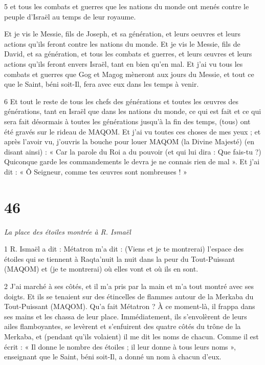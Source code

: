 \par 5 et tous les combats et guerres que les nations du monde ont menés contre le peuple d'Israël au temps de leur royaume.

\par Et je vis le Messie, fils de Joseph, et sa génération, et leurs oeuvres et leurs actions qu'ils feront contre les nations du monde. Et je vis le Messie, fils de David, et sa génération, et tous les combats et guerres, et leurs œuvres et leurs actions qu'ils feront envers Israël, tant en bien qu'en mal. Et j'ai vu tous les combats et guerres que Gog et Magog mèneront aux jours du Messie, et tout ce que le Saint, béni soit-Il, fera avec eux dans les temps à venir.

\par 6 Et tout le reste de tous les chefs des générations et toutes les œuvres des générations, tant en Israël que dans les nations du monde, ce qui est fait et ce qui sera fait désormais à toutes les générations jusqu'à la fin des temps, (tous) ont été gravés sur le rideau de MAQOM. Et j'ai vu toutes ces choses de mes yeux ; et après l'avoir vu, j'ouvris la bouche pour louer MAQOM (la Divine Majesté) (en disant ainsi) : « Car la parole du Roi a du pouvoir (et qui lui dira : Que fais-tu ?) Quiconque garde les commandements le devra je ne connais rien de mal ». Et j’ai dit : « Ô Seigneur, comme tes œuvres sont nombreuses ! »



\chapter{46}

\par \textit{La place des étoiles montrée à R. Ismaël}

\par 1 R. Ismaël a dit : Métatron m'a dit : (Viens et je te montrerai) l'espace des étoiles qui se tiennent à Raqta'nuit la nuit dans la peur du Tout-Puissant (MAQOM) et (je te montrerai) où elles vont et où ils en sont.

\par 2 J'ai marché à ses côtés, et il m'a pris par la main et m'a tout montré avec ses doigts. Et ils se tenaient sur des étincelles de flammes autour de la Merkaba du Tout-Puissant (MAQOM). Qu'a fait Métatron ? À ce moment-là, il frappa dans ses mains et les chassa de leur place. Immédiatement, ils s'envolèrent de leurs ailes flamboyantes, se levèrent et s'enfuirent des quatre côtés du trône de la Merkaba, et (pendant qu'ils volaient) il me dit les noms de chacun. Comme il est écrit : « Il donne le nombre des étoiles ; il leur donne à tous leurs noms », enseignant que le Saint, béni soit-Il, a donné un nom à chacun d'eux.


